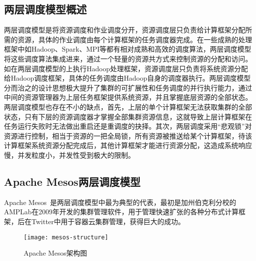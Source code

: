 \subsection{两层调度模型概述}
两层调度模型是将资源调度和作业调度分开，资源调度层只负责给计算框架分配所需的资源，具体的作业调度由每个计算框架的任务调度器完成。在一些成熟的处理框架中如Hadoop、Spark、MPI等都有相对成熟和高效的调度算法，两层调度模型将这些调度算法集成进来，通过一个轻量的资源共方式来控制资源的分配和访问。如在两层调度模型的上执行Hadoop处理框架，资源调度层只负责将系统资源分配给Hadoop调度框架，具体的任务调度由Hadoop自身的调度器执行。两层调度模型分而治之的设计思想极大提升了集群的可扩展性和任务调度的并行执行能力，通过中间的资源管理器为上层任务框架提供系统资源，并且掌握底层资源的全部状态。两层调度模型也存在不小的缺点，首先，上层的单个计算框架无法获取集群的全部状态，只有下层的资源调度器才掌握全部集群资源信息，这就导致上层计算框架在任务运行失败时无法做出重启还是重调度的抉择。其次，两层调度采用“悲观锁”对资源进行控制，相当于资源的一把全局锁，所有资源被推送给某个计算框架，待该计算框架系统资源分配完成后，其他计算框架才能进行资源分配，这造成系统响应慢，并发粒度小，并发性受到极大的限制。

\subsection{Apache Mesos两层调度模型}
Apache Mesos~\cite{Mesos2011}是两层调度模型中最为典型的代表，最初是加州伯克利分校的AMPLab在2009年开发的集群管理软件，用于管理快速扩张的各种分布式计算框架，后在Twitter中用于容器云集群管理，获得巨大的成功。

\begin{figure}[H] %
	\centering
	\texttt{[image: mesos-structure]}
	\caption{Apache Mesos架构图}
\end{figure}

